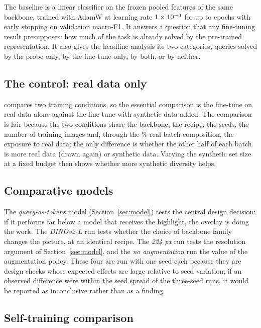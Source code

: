 The baseline is a linear classifier on the frozen pooled features of the same backbone, trained with AdamW at learning rate $1\times 10^{-3}$ for up to \probeEpochs{} epochs with early stopping on validation macro-F1. It answers a question that any fine-tuning result presupposes: how much of the task is already solved by the pre-trained representation. It also gives the headline analysis its two categories, queries solved by the probe only, by the fine-tune only, by both, or by neither.

\subsection{The control: real data only}

\Hone{} compares two training conditions, so the essential comparison is the fine-tune on real data alone against the fine-tune with synthetic data added. The comparison is fair because the two conditions share the backbone, the recipe, the seeds, the number of training images and, through the \ftRealFractionPct\%-real batch composition, the exposure to real data; the only difference is whether the other half of each batch is more real data (drawn again) or synthetic data. Varying the synthetic set size at a fixed budget then shows whether more synthetic diversity helps.

\subsection{Comparative models}

The \emph{query-as-tokens} model (Section~\ref{sec:model}) tests the central design decision: if it performs far below a model that receives the highlight, the overlay is doing the work. The \emph{DINOv2-L} run tests whether the choice of backbone family changes the picture, at an identical recipe. The \emph{224 px} run tests the resolution argument of Section~\ref{sec:model}, and the \emph{no augmentation} run the value of the augmentation policy. These four are run with one seed each because they are design checks whose expected effects are large relative to seed variation; if an observed difference were within the seed spread of the three-seed runs, it would be reported as inconclusive rather than as a finding.

\subsection{Self-training comparison}

